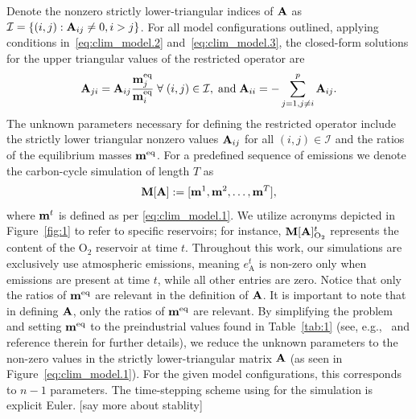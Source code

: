 \documentclass[11pt, a4paper, pdftex, twoside, dvipsnames]{article}
\renewcommand{\ref}{\cref}
\newcommand{\bb}[1]{\boldsymbol{\bold{#1}}}
\begin{document}
Denote the nonzero strictly lower-triangular indices of $\bb{A}$ as $\mathcal{I}=\{(i,j):\bb{A}_{ij}\neq 0,i>j\}$.
For all model configurations outlined, applying conditions in~\eqref{eq:clim_model.2} and~\eqref{eq:clim_model.3}, the closed-form solutions for the upper triangular values of the restricted operator are
%
\begin{align} \label{eq:clim_model.4}
	\bb{A}_{ji} = \bb{A}_{ij}  \frac{\bb{m}^{\text{eq}}_j}{\bb{m}^{\text{eq}}_i} \; \forall \; (i,j) \in \mathcal{I}, \; \text{and} \;  \bb{A}_{ii}= -\sum_{j=1,j\neq i}^p \bb{A}_{ij}.
\end{align}
%
The unknown parameters necessary for defining the restricted operator include the strictly lower triangular nonzero values $\bb{A}_{ij}$ for all $(i,j) \in \mathcal{I}$ and the ratios of the equilibrium masses $\bb{m}^{\text{eq}}$. 
For a predefined sequence of emissions we denote the carbon-cycle simulation of length $T$ as   
%
\begin{align} \label{eq:clim_model.5}
	\bb{M}[\bb{A}] := [ \bb{m}^{1},\bb{m}^{2},\ldots,\bb{m}^{T} ], 
\end{align}
%
where $\bb{m}^{t}$ is defined as per \eqref{eq:clim_model.1}. 
We utilize acronyms depicted in Figure~\ref{fig:1} to refer to specific reservoirs; for instance, $\bb{M}[\bb{A}]^{t}_{\text{O}_2}$ represents the content of the $\text{O}_2$ reservoir at time $t$.
Throughout this work, our simulations are exclusively use atmospheric emissions, meaning $e_{\text{A}}^t$ is non-zero only when emissions are present at time $t$, while all other entries are zero.
Notice that only the ratios of $\bb{m}^{\text{eq}}$ are relevant in the definition of $\bb{A}$.
It is important to note that in defining $\bb{A}$, only the ratios of $\bb{m}^{\text{eq}}$ are relevant. 
By simplifying the problem and setting $\bb{m}^{\text{eq}}$ to the preindustrial values found in Table~\ref{tab:1} (see, e.g.,~\cite{2431585063dd4b78b890f885bb19642e} and reference therein for further details), we reduce the unknown parameters to the non-zero values in the strictly lower-triangular matrix $\bb{A}$ (as seen in Figure~\ref{eq:clim_model.1}). 
For the given model configurations, this corresponds to $n-1$ parameters.
The time-stepping scheme using for the simulation is explicit Euler. [say more about stablity] 
%
\end{document}
